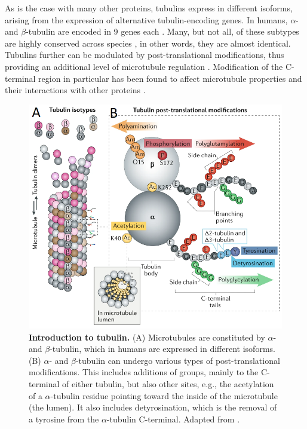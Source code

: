 As is the case with many other proteins, tubulins express in different isoforms, arising from the expression of alternative tubulin-encoding genes. In humans, $\alpha$- and $\beta$-tubulin are encoded in 9 genes each . Many, but not all, of these subtypes are highly conserved across species , in other words, they are almost identical. Tubulins further can be modulated by post-translational modifications, thus providing an additional level of microtubule regulation \parencite{Janke2014}. Modification of the C-terminal region in particular has been found to affect microtubule properties and their interactions with other proteins \parencite{Janke2020}. 

\begin{figure}[h!tb]
	\centering
	\includegraphics[width=0.6\linewidth]{Figures/tubcode.png}
	\caption[Introduction to tubulin.]{\textbf{Introduction to tubulin.}
	(A) Microtubules are constituted by $\alpha$- and $\beta$-tubulin, which in humans are expressed in different isoforms. (B) $\alpha$- and $\beta$-tubulin can undergo various types of post-translational modifications. This includes additions of groups, mainly to the C-terminal of either tubulin, but also other sites, e.g., the acetylation of a $\alpha$-tubulin residue pointing toward the inside of the microtubule (the lumen). It also includes detyrosination, which is the removal of a tyrosine from the $\alpha$-tubulin C-terminal. Adapted from \cite{Janke2020}.
		}\label{tubcode}
\end{figure}

